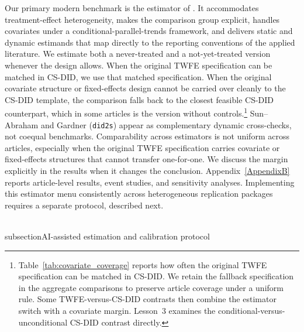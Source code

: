\documentclass[11pt]{article}
\begin{document}
Our primary modern benchmark is the estimator of \textcite{callaway2021difference}. It accommodates treatment-effect heterogeneity, makes the comparison group explicit, handles covariates under a conditional-parallel-trends framework, and delivers static and dynamic estimands that map directly to the reporting conventions of the applied literature. We estimate both a never-treated and a not-yet-treated version whenever the design allows. When the original TWFE specification can be matched in CS-DID, we use that matched specification. When the original covariate structure or fixed-effects design cannot be carried over cleanly to the CS-DID template, the comparison falls back to the closest feasible CS-DID counterpart, which in some articles is the version without controls.\footnote{Table~\ref{tab:covariate_coverage} reports how often the original TWFE specification can be matched in CS-DID. We retain the fallback specification in the aggregate comparisons to preserve article coverage under a uniform rule. Some TWFE-versus-CS-DID contrasts then combine the estimator switch with a covariate margin. Lesson~3 examines the conditional-versus-unconditional CS-DID contrast directly.} Sun--Abraham and Gardner (\texttt{did2s}) appear as complementary dynamic cross-checks, not coequal benchmarks. Comparability across estimators is not uniform across articles, especially when the original TWFE specification carries covariate or fixed-effects structures that cannot transfer one-for-one. We discuss the margin explicitly in the results when it changes the conclusion. Appendix~\ref{AppendixB} reports article-level results, event studies, and sensitivity analyses. Implementing this estimator menu consistently across heterogeneous replication packages requires a separate protocol, described next.







%



\\subsection{AI-assisted estimation and calibration protocol}
\end{document}
